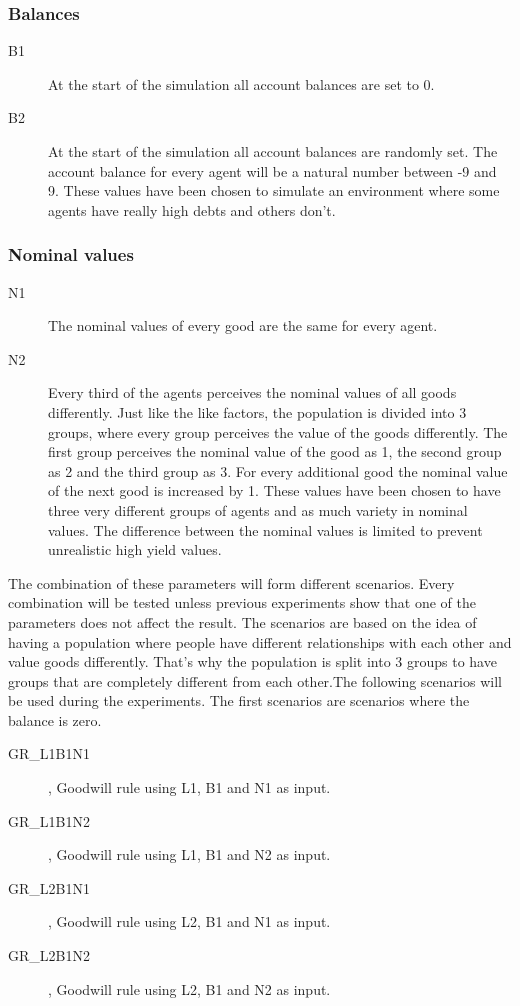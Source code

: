 \documentclass[twoside,openright]{uva-bachelor-thesis}
\begin{document}
\subsubsection{Balances}
\begin{description}
\item[B1]	At the start of the simulation all account balances are set to 0.
\item[B2]	At the start of the simulation all account balances are randomly set. The account balance for every agent will be a natural number between -9 and 9. These values have been chosen to simulate an environment where some agents have really high debts and others don't.
\end{description}
\subsubsection{Nominal values}
\begin{description}
\item[N1]	The nominal values of every good are the same for every agent.
\item[N2]	Every third of the agents perceives the nominal values of all goods differently. Just like the like factors, the population is divided into 3 groups, where every group perceives the value of the goods differently. The first group perceives the nominal value of the good as 1, the second group as 2 and the third group as 3. For every additional good the nominal value of the next good is increased by 1. These values have been chosen to have three very different groups of agents and as much variety in nominal values. The difference between the nominal values is limited to prevent unrealistic high yield values.
\end{description} 
The combination of these parameters will form different scenarios. Every combination will be tested unless previous experiments show that one of the parameters does not affect the result. The scenarios are based on the idea of having a population where people have different relationships with each other and value goods differently. That’s why the population is split into 3 groups to have groups that are completely different from each other.The following scenarios will be used during the experiments.
The first scenarios are scenarios where the balance is zero.
\begin{description}
\item[GR\_L1B1N1], Goodwill rule using L1, B1 and N1 as input.
\item[GR\_L1B1N2], Goodwill rule using L1, B1 and N2 as input.
\item[GR\_L2B1N1], Goodwill rule using L2, B1 and N1 as input.
\item[GR\_L2B1N2], Goodwill rule using L2, B1 and N2 as input.
\end{description}
\end{document}
